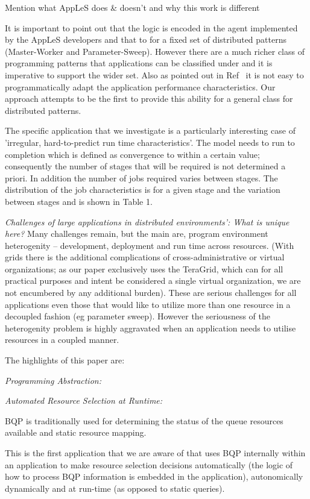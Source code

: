 \documentclass[conference,final]{IEEEtran}
\begin{document}
Mention what AppLeS does \& doesn't and why this work is different

It is important to point out that the logic is encoded in the agent
implemented by the AppLeS developers and that to for a fixed set of
distributed patterns (Master-Worker and Parameter-Sweep).  However
there are a much richer class of programming patterns that
applications can be classified under and it is imperative to support
the wider set. Also as pointed out in Ref~\cite{apples03} it is not
easy to programmatically adapt the application performance
characteristics. Our approach attempts to be the first to provide this
ability for a general class for distributed patterns.

The specific application that we investigate is a particularly
interesting case of 'irregular, hard-to-predict run time
characteristics'.  The model needs to run to completion which is
defined as convergence to within a certain value; consequently the
number of stages that will be required is not determined a priori. In
addition the number of jobs required varies between stages. The
distribution of the job characteristics is for a given stage and the
variation between stages and is shown in Table 1.

{\it Challenges of large applications in distributed environments':
  What is unique here?}  Many challenges remain, but the main are,
program environment heterogenity -- development, deployment and run
time across resources.  (With grids there is the additional
complications of cross-administrative or virtual organizations; as our
paper exclusively uses the TeraGrid, which can for all practical
purposes and intent be considered a single virtual organization, we
are not encumbered by any additional burden). These are serious
challenges for all applications even those that would like to utilize
more than one resource in a decoupled fashion (eg parameter sweep).
However the seriousness of the heterogenity problem is highly
aggravated when an application needs to utilise resources in a coupled
manner.

The highlights of this paper are:

{\it Programming Abstraction:} 


{\it Automated Resource Selection at Runtime:}

BQP is traditionally used for determining the status of the queue
resources available and static resource mapping.


This is the first application that we are aware of that uses BQP
internally within an application to make resource selection decisions
automatically (the logic of how to process BQP information is embedded
in the application), autonomically dynamically and at run-time (as
opposed to static queries).
\end{document}
